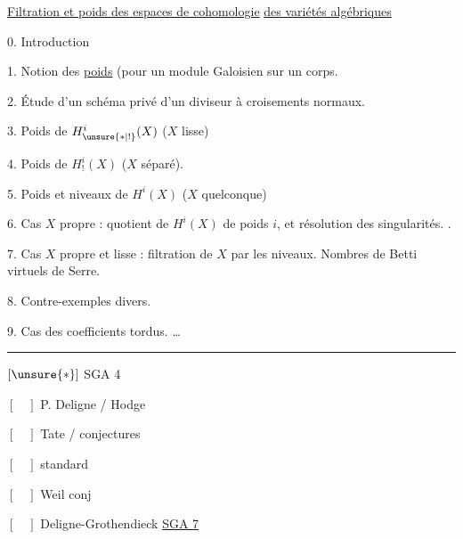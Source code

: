 
\uline{Filtration et poids  des espaces de cohomologie}
\uline{des variétés algébriques}

0. Introduction

1. Notion des \uline{poids}  (pour un  module  Galoisien sur un corps.

2. Étude d'un schéma privé d'un diviseur à croisements normaux.

3. Poids  de $H^i_{\unsure{*|!}}(X)$ ($X$ lisse)

4. Poids  de $H^i_!(X)$ ($X$ séparé). 

5. Poids et niveaux de $H^i(X)$ ($X$ quelconque)

6. Cas $X$ propre :  quotient de $H^i(X)$ de poids $i$, et résolution des singularités. .

7. Cas $X$ propre et lisse : filtration de $X$ par les niveaux.
Nombres de Betti virtuels de Serre.

8. Contre-exemples divers.

9. Cas des coefficients tordus. \ldots

\hrule

$[\unsure{*}]$ SGA 4

$[\quad]$ P. Deligne / Hodge

$[\quad]$ Tate / conjectures

$[\quad]$   standard

$[\quad]$ Weil conj

$[\quad]$ Deligne-Grothendieck \uline{SGA 7}
